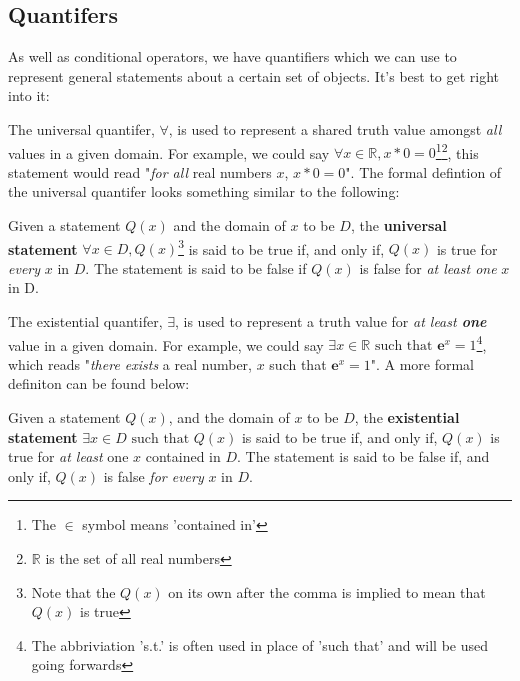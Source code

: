 \documentclass[addpoints]{exam}
\begin{document}
\newpage 
{}
\subsection*{Quantifers}
As well as conditional operators, we have quantifiers which we can use to represent general statements about a certain set of objects. It's best to get right into it: 

\begin{tcolorbox}[title=UNIVERSAL QUANTIFIER,colframe=black,sharp corners,colback=white,colbacktitle=white,coltitle=black]
  The universal quantifer, $\forall$, is used to represent a shared truth value amongst \textit{all} values in a given domain. For example, we could say $\forall x \in \mathbb{R}, x * 0 = 0$\footnote{The $\in$ symbol means 'contained in'}\footnote{$\mathbb{R}$ is the set of all real numbers}, this statement would read "\textit{for all} real numbers $x$, $x * 0 = 0$". The formal defintion of the universal quantifer looks something similar to the following: 
  \begin{center}
    Given a statement $Q(x)$ and the domain of $x$ to be $D$, the \textbf{universal statement} $\forall x \in D, Q(x)$\footnote{Note that the $Q(x)$ on its own after the comma is implied to mean that $Q(x)$ is true} is said to be true if, and only if, $Q(x)$ is true for \textit{every} $x$ in $D$. The statement is said to be false if $Q(x)$ is false for \textit{at least one} $x$ in D.
  \end{center}
\end{tcolorbox}

\begin{tcolorbox}[title=EXISTENTIAL QUANTIFIER,colframe=black,sharp corners,colback=white,colbacktitle=white,coltitle=black]
  The existential quantifer, $\exists$, is used to represent a truth value for \textit{at least \textbf{one}} value in a given domain. For example, we could say $\exists x \in \mathbb {R} \text{ such that } \mathrm{\textbf{e}}^{x} = 1$\footnote{The abbriviation 's.t.' is often used in place of 'such that' and will be used going forwards}, which reads "\textit{there exists} a real number, $x$ such that $\mathrm{\textbf{e}}^{x} = 1$". A more formal definiton can be found below:
  \begin{center}
    Given a statement $Q(x)$, and the domain of $x$ to be $D$, the \textbf{existential statement} $\exists x \in D \text{ such that } Q(x)$ is said to be true if, and only if, $Q(x)$ is true for \textit{at least} one $x$ contained in $D$. The statement is said to be false if, and only if, $Q(x)$ is false \textit{for every} $x$ in $D$.
  \end{center}
\end{tcolorbox}
\end{document}
